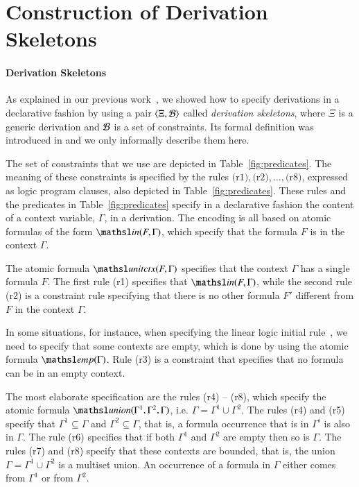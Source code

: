 \documentclass{ebl}
\newcommand{\elin}[2]{\ensuremath{{\tsl{unitctx}(\ensuremath{#1}, \ensuremath{#2})}}}
\newcommand{\emp}[1]{\ensuremath{{\tsl{emp}(\ensuremath{#1})}}}
\newcommand{\union}[3]{\ensuremath{{\tsl{union}(\ensuremath{#1},\ensuremath{#2},\ensuremath{ #3})}}}
\newcommand{\In}[2]{\ensuremath{\tsl{in}(\ensuremath{#1},\ensuremath{#2})}}
\begin{document}
\section{Construction of Derivation Skeletons}

\paragraph{Derivation Skeletons}
As explained in our previous work~\cite{nigam13iclp}, we showed how to specify derivations in a declarative fashion 
by using a pair $\langle\Xi, {\cal B}\rangle$ called \emph{derivation skeletons}, where $\Xi$ is a generic derivation and 
${\cal B}$ is a set of constraints.
Its formal definition was introduced in \cite{nigam13iclp} and we only informally describe them here.   

The set of constraints that we use are depicted in Table~\ref{fig:predicates}.
The meaning of these constraints is specified by the rules $\textrm{(r1)},
\textrm{(r2)},\ldots, \textrm{(r8)}$, expressed as logic program clauses, 
also depicted in Table~\ref{fig:predicates}. These
rules and the predicates in Table~\ref{fig:predicates} specify in a declarative 
fashion the content of a context variable, $\Gamma$, in a derivation.
The encoding is all based on atomic formulas of the form $\In{F}{\Gamma}$, which 
specify that the formula $F$ is in the context $\Gamma$. 

The atomic formula $\elin{F}{\Gamma}$ specifies that the context $\Gamma$ has a
single formula $F$. 
The first rule (r1) specifies that $\In{F}{\Gamma}$, while the second rule (r2) is a constraint
rule specifying that there is no other formula $F'$ different from $F$ in the context $\Gamma$.

In some situations, for instance, when specifying the linear logic initial rule~\cite{girard87tcs}, 
we need to specify that some contexts are empty, which is done by using the atomic formula $\emp{\Gamma}$.  
Rule (r3) is a constraint that specifies that no formula can be in an empty context.
 
The most elaborate specification are the rules (r4) -- (r8), which specify the atomic formula 
$\union{\Gamma^1} {\Gamma^2} {\Gamma}$, i.e. $\Gamma = \Gamma^1 \cup \Gamma^2$.
The rules (r4) and (r5) specify that $\Gamma^1 \subseteq \Gamma$ and $\Gamma^2 \subseteq \Gamma$, 
that is, a formula occurrence that is in $\Gamma^i$ is also in $\Gamma$. The rule (r6) specifies that 
if both $\Gamma^1$ and $\Gamma^2$ are empty then so is $\Gamma$. 
The rules (r7) and (r8) 
specify that these contexts are bounded, that is, the union 
$\Gamma = \Gamma^1 \cup \Gamma^2$ is a multiset union. An occurrence of a formula in $\Gamma$ either comes
from $\Gamma^1$ or from $\Gamma^2$.  
\end{document}
